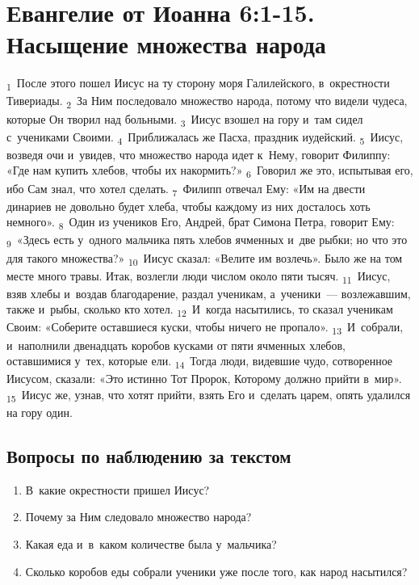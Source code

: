 \documentclass[a4paper,12pt]{article}
\begin{document}
\section{Евангелие от Иоанна 6:1-15. Насыщение множества народа}

\textsubscript{1}~После этого пошел Иисус на ту сторону моря Галилейского, в~окрестности Тивериады. \textsubscript{2}~За Ним последовало множество народа, потому что видели чудеса, которые Он творил над больными. \textsubscript{3}~Иисус взошел на гору и~там сидел с~учениками Своими. \textsubscript{4}~Приближалась же Пасха, праздник иудейский. \textsubscript{5}~Иисус, возведя очи и~увидев, что множество народа идет к~Нему, говорит Филиппу: «Где нам купить хлебов, чтобы их накормить?» \textsubscript{6}~Говорил же это, испытывая его, ибо Сам знал, что хотел сделать. \textsubscript{7}~Филипп отвечал Ему: «Им на двести динариев не довольно будет хлеба, чтобы каждому из них досталось хоть немного». \textsubscript{8}~Один из учеников Его, Андрей, брат Симона Петра, говорит Ему: \textsubscript{9}~«Здесь есть у~одного мальчика пять хлебов ячменных и~две рыбки; но что это для такого множества?» \textsubscript{10}~Иисус сказал: «Велите им возлечь». Было же на том месте много травы. Итак, возлегли люди числом около пяти тысяч. \textsubscript{11}~Иисус, взяв хлебы и~воздав благодарение, раздал ученикам, а~ученики~--- возлежавшим, также и~рыбы, сколько кто хотел. \textsubscript{12}~И~когда насытились, то сказал ученикам Своим: «Соберите оставшиеся куски, чтобы ничего не пропало». \textsubscript{13}~И~собрали, и~наполнили двенадцать коробов кусками от пяти ячменных хлебов, оставшимися у~тех, которые ели. \textsubscript{14}~Тогда люди, видевшие чудо, сотворенное Иисусом, сказали: «Это истинно Тот Пророк, Которому должно прийти в~мир». \textsubscript{15}~Иисус же, узнав, что хотят прийти, взять Его и~сделать царем, опять удалился на гору один. 

\subsection*{Вопросы по наблюдению за текстом}
\begin{enumerate}
    \item В~какие окрестности пришел Иисус? 
    
    \myline
    
    \item Почему за Ним следовало множество народа? 
    
    \myline
    
    \item Какая еда и~в~каком количестве была у~мальчика? 
    
    \myline
    
    \item Сколько коробов еды собрали ученики уже после того, как народ насытился? 
    
    \myline
\end{enumerate}
\end{document}
